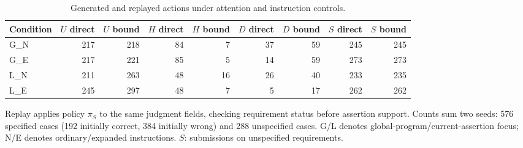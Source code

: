 \begin{table}[t]
\centering
\small
\caption{Generated and replayed actions under attention and instruction controls.}
\label{tab:action}
\begin{tabular}{lrrrrrrrr}
\toprule
Condition & $U$ direct & $U$ bound & $H$ direct & $H$ bound & $D$ direct & $D$ bound & $S$ direct & $S$ bound \\
\midrule
G\_N & 217 & 218 & 84 & 7 & 37 & 59 & 245 & 245 \\
G\_E & 217 & 221 & 85 & 5 & 14 & 59 & 273 & 273 \\
L\_N & 211 & 263 & 48 & 16 & 26 & 40 & 233 & 235 \\
L\_E & 245 & 297 & 48 & 7 & 5 & 17 & 262 & 262 \\
\bottomrule
\end{tabular}
\par\smallskip
\begin{minipage}{\linewidth}
\footnotesize
Replay applies policy $\pi_S$ to the same judgment fields, checking requirement status before assertion support. Counts sum two seeds: 576 specified cases (192 initially correct, 384 initially wrong) and 288 unspecified cases. G/L denotes global-program/current-assertion focus; N/E denotes ordinary/expanded instructions. $S$: submissions on unspecified requirements.
\end{minipage}
\end{table}
